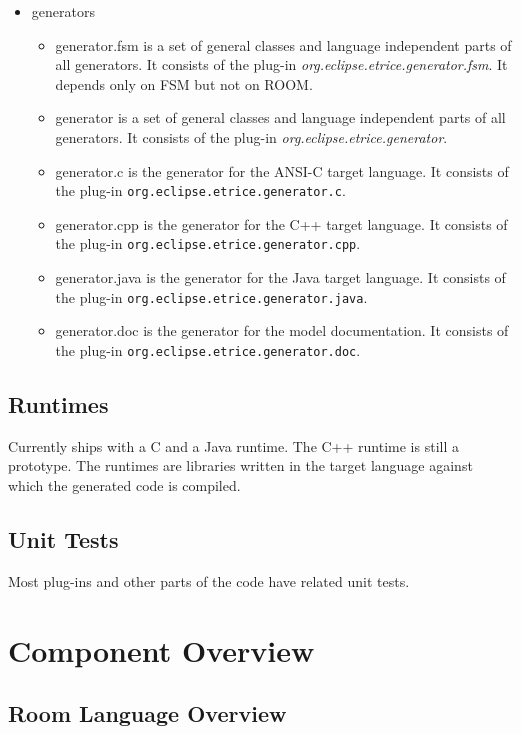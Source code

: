 \begin{itemize}
\item generators
\begin{itemize}
\item generator.fsm is a set of general classes and language independent parts of all generators. It consists 
of the plug-in \textit{org.eclipse.etrice.generator.fsm}. It depends only on FSM but not on ROOM.
\item generator is a set of general classes and language independent parts of all generators. It consists 
of the plug-in \textit{org.eclipse.etrice.generator}.
\item generator.c is the generator for the ANSI-C target language. It consists of the plug-in 
\texttt{org.eclipse.etrice.generator.c}.
\item generator.cpp is the generator for the C++ target language. It consists of the plug-in 
\texttt{org.eclipse.etrice.generator.cpp}.
\item generator.java is the generator for the Java target language. It consists of the plug-in 
\texttt{org.eclipse.etrice.generator.java}.
\item generator.doc is the generator for the model documentation. It consists of the plug-in 
\texttt{org.eclipse.etrice.generator.doc}.
\end{itemize}
\end{itemize}

\subsection{Runtimes}

Currently \eTrice{} ships with a C and a Java runtime. The C++ runtime is still a prototype.
The runtimes are libraries written in the target 
language against which the generated code is compiled.

\subsection{Unit Tests}

Most plug-ins and other parts of the code have related unit tests.

\section{Component Overview}

\subsection{Room Language Overview}

